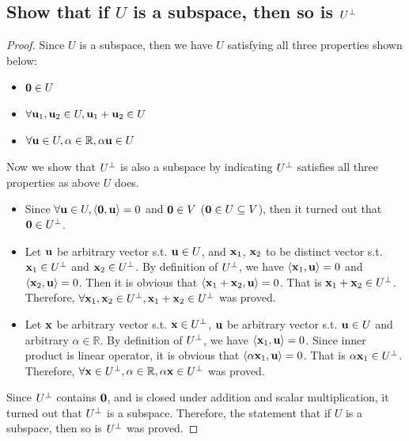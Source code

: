 \documentclass[11pt,a4paper]{article}
\begin{document}
\subsection{Show that if $U$ is a subspace, then so is $U^{\perp}$}
\begin{proof}
    Since $U$ is a subspace, then we have $U$ satisfying all three properties
    shown below:
    \begin{itemize}
       \item $\mathbf{0} \in U$ 
       \item $\forall \mathbf{u}_1, \mathbf{u}_2 \in U, \mathbf{u}_1 + \mathbf{u}_2 \in U$
       \item $\forall \mathbf{u} \in U, \alpha \in \mathbb{R}, \alpha \mathbf{u} \in U$
    \end{itemize}
    Now we show that $U^{\perp}$ is also a subspace by indicating $U^{\perp}$
    satisfies all three properties as above $U$ does.
    \begin{itemize}
        \item Since $\forall \mathbf{u} \in U, \langle \mathbf{0}, \mathbf{u} \rangle = 0$
            and $\mathbf{0} \in V$ ($\mathbf{0} \in U \subseteq V$), then it
            turned out that $\mathbf{0} \in U^{\perp}$.
        \item Let $\mathbf{u}$ be arbitrary vector s.t. $\mathbf{u} \in U$, and
            $\mathbf{x}_1$, $\mathbf{x}_2$ to be distinct vector s.t. $\mathbf{x}_1 \in U^{\perp}$
            and $\mathbf{x}_2 \in U^{\perp}$. By definition of $U^{\perp}$, we have 
            $\langle \mathbf{x}_1, \mathbf{u} \rangle = 0$ and 
            $\langle \mathbf{x}_2, \mathbf{u} \rangle = 0$. 
            Then it is obvious that 
            $\langle \mathbf{x}_1 + \mathbf{x}_2, \mathbf{u} \rangle = 0$. 
            That is $\mathbf{x}_1 +\mathbf{x}_2 \in U^{\perp}$.
            Therefore, $\forall \mathbf{x}_1, \mathbf{x}_2 \in U^{\perp}, \mathbf{x}_1+\mathbf{x}_2 \in U^{\perp}$ was proved.
        \item Let $\mathbf{x}$ be arbitrary vector s.t. $\mathbf{x} \in U^{\perp}$, 
            $\mathbf{u}$ be arbitrary vector s.t. $\mathbf{u} \in U$ and
            arbitrary $\alpha \in \mathbb{R}$. By definition of $U^{\perp}$, we have 
            $\langle \mathbf{x}_1, \mathbf{u} \rangle = 0$. 
            Since inner product is linear operator, it is obvious that
            $\langle \alpha \mathbf{x}_1, \mathbf{u} \rangle = 0$. 
            That is $\alpha \mathbf{x}_1 \in U^{\perp}$.
            Therefore, $\forall \mathbf{x} \in U^{\perp}, \alpha \in \mathbb{R}, \alpha
            \mathbf{x} \in U^{\perp}$ was proved.
    \end{itemize}
    Since $U^{\perp}$ contains $\mathbf{0}$, and is closed under addition and scalar
    multiplication, it turned out that $U^{\perp}$ is a subspace. 
    Therefore, the statement that if $U$ is a subspace, then so is $U^{\perp}$ was
    proved.
\end{proof}
\end{document}
